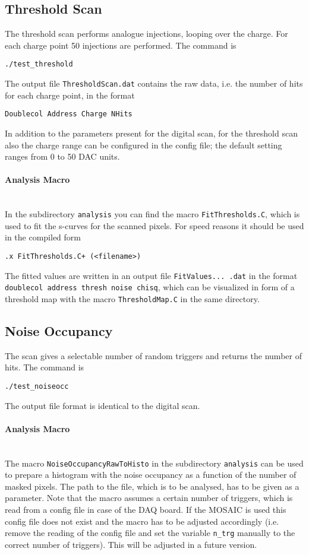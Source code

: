\documentclass{article}
\begin{document}
\subsection{Threshold Scan}
The threshold scan performs analogue injections, looping over the
charge. For each charge point 50 injections are performed. The command
is 
\begin{verbatim}
./test_threshold
\end{verbatim}
The output file \texttt{ThresholdScan.dat} contains the raw data, i.e. the
number of hits for each charge point, in the format
\begin{verbatim}
Doublecol Address Charge NHits
\end{verbatim}
In addition to the parameters present for the digital scan, for the threshold scan also the charge range can be configured in the config file; the default setting ranges from 0 to 50 DAC units.

\paragraph {Analysis Macro} \hfill \\
In the subdirectory \texttt{analysis} you can find the macro \texttt{FitThresholds.C}, which is used to fit the s-curves for the scanned pixels. For speed reasons it should be used in the compiled form 
\begin{verbatim}
.x FitThresholds.C+ (<filename>)
\end{verbatim}

The fitted values are written in an output file \texttt{FitValues... .dat} in the format \texttt{doublecol address thresh noise chisq}, which can be visualized in form of a threshold map with the macro \texttt{ThresholdMap.C} in the same directory. 


\subsection{Noise Occupancy}
The scan gives a selectable number of random triggers and returns the
number of hits. The command is 
\begin{verbatim}
./test_noiseocc
\end{verbatim}
The output file format is identical to the digital scan. 

\paragraph {Analysis Macro} \hfill \\
The macro \texttt{NoiseOccupancyRawToHisto} in the subdirectory \texttt{analysis} can be used to prepare a histogram with the noise occupancy as a function of the number of masked pixels. The path to the file, which is to be analysed, has to be given as a parameter. Note that the macro assumes a certain number of triggers, which is read from a config file in case of the DAQ board. If the MOSAIC is used this config file does not exist and the macro has to be adjusted accordingly (i.e. remove the reading of the config file and set the variable \texttt{n\_trg} manually to the correct number of triggers). This will be adjusted in a future version.
\end{document}
